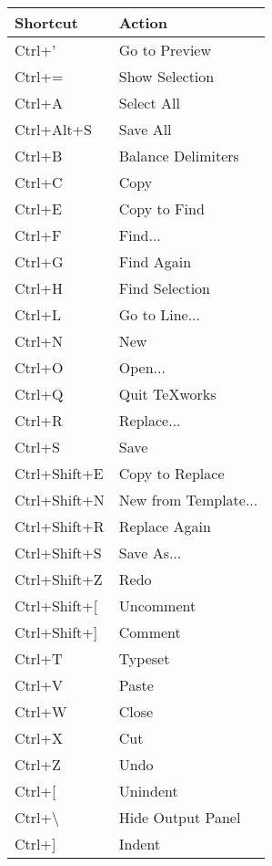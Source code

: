 \begin{longtable}{Pl}
\toprule
Shortcut     & Action \\
\midrule \endhead
Ctrl+'              & Go to Preview \\
Ctrl+=              & Show Selection \\
Ctrl+A              & Select All \\
Ctrl+Alt+S          & Save All \\
Ctrl+B              & Balance Delimiters \\
Ctrl+C              & Copy \\
Ctrl+E              & Copy to Find \\
Ctrl+F              & Find... \\
Ctrl+G              & Find Again \\
Ctrl+H              & Find Selection \\
Ctrl+L              & Go to Line... \\
Ctrl+N              & New \\
Ctrl+O              & Open... \\
Ctrl+Q              & Quit TeXworks \\
Ctrl+R              & Replace... \\
Ctrl+S              & Save \\
Ctrl+Shift+E        & Copy to Replace \\
Ctrl+Shift+N        & New from Template... \\
Ctrl+Shift+R        & Replace Again \\
Ctrl+Shift+S        & Save As... \\
Ctrl+Shift+Z        & Redo \\
Ctrl+Shift+[        & Uncomment \\
Ctrl+Shift+]        & Comment \\
Ctrl+T              & Typeset \\
Ctrl+V              & Paste \\
Ctrl+W              & Close \\
Ctrl+X              & Cut \\
Ctrl+Z              & Undo \\
Ctrl+[              & Unindent \\
Ctrl+\textbackslash & Hide Output Panel \\
Ctrl+]              & Indent \\
\bottomrule
\end{longtable}
